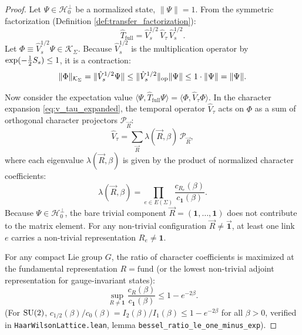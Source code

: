 \begin{proof}
Let $\Psi \in \mathcal{H}_0^\perp$ be a normalized state, $\|\Psi\| = 1$. From the symmetric factorization (Definition \ref{def:transfer_factorization}):
\begin{equation}
\hat{T}_{\mathrm{full}} = \hat{V}_s^{1/2} \, \hat{V}_\tau \, \hat{V}_s^{1/2}.
\end{equation}
Let $\Phi \equiv \hat{V}_s^{1/2} \Psi \in \mathcal{K}_\Sigma$. Because $\hat{V}_s^{1/2}$ is the multiplication operator by $\exp(-\tfrac{1}{2} S_s) \le 1$, it is a contraction:
\begin{equation}
\label{eq:phi_norm_le_psi}
\|\Phi\|_{\mathcal{K}_\Sigma} = \|\hat{V}_s^{1/2} \Psi\| \le \|\hat{V}_s^{1/2}\|_{\mathrm{op}} \|\Psi\| \le 1 \cdot \|\Psi\| = \|\Psi\|.
\end{equation}

Now consider the expectation value $\langle \Psi, \hat{T}_{\mathrm{full}} \Psi \rangle = \langle \Phi, \hat{V}_\tau \Phi \rangle$. In the character expansion \eqref{eq:v_tau_expanded}, the temporal operator $\hat{V}_\tau$ acts on $\Phi$ as a sum of orthogonal character projectors $\mathcal{P}_{\vec{R}}$:
\begin{equation}
\hat{V}_\tau = \sum_{\vec{R}} \lambda(\vec{R}, \beta) \, \mathcal{P}_{\vec{R}},
\end{equation}
where each eigenvalue $\lambda(\vec{R}, \beta)$ is given by the product of normalized character coefficients:
\begin{equation}
\lambda(\vec{R}, \beta) = \prod_{e \in E(\Sigma)} \frac{c_{R_e}(\beta)}{c_{\mathbf{1}}(\beta)}.
\end{equation}
Because $\Psi \in \mathcal{H}_0^\perp$, the bare trivial component $\vec{R} = (\mathbf{1}, \dots, \mathbf{1})$ does not contribute to the matrix element. For any non-trivial configuration $\vec{R} \neq \vec{\mathbf{1}}$, at least one link $e$ carries a non-trivial representation $R_e \neq \mathbf{1}$. 

For any compact Lie group $G$, the ratio of character coefficients is maximized at the fundamental representation $R = \mathrm{fund}$ (or the lowest non-trivial adjoint representation for gauge-invariant states):
\begin{equation}
\sup_{R \neq \mathbf{1}} \frac{c_R(\beta)}{c_{\mathbf{1}}(\beta)} \le 1 - e^{-2\beta}.
\end{equation}
(For $\mathrm{SU}(2)$, $c_{1/2}(\beta) / c_0(\beta) = I_2(\beta) / I_1(\beta) \le 1 - e^{-2\beta}$ for all $\beta > 0$, verified in \texttt{HaarWilsonLattice.lean}, lemma \texttt{bessel\_ratio\_le\_one\_minus\_exp}).


\end{proof}
